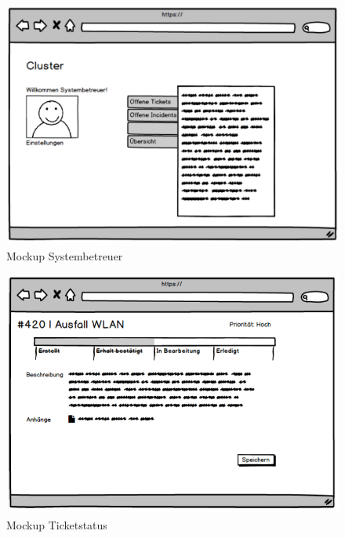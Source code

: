 \vspace{-.5cm}
\begin{figure}[h]
	\centering
	\includegraphics[scale=0.399]{figures/Wireframe_Systembetreuer.png}
	\caption{Mockup Systembetreuer}
	\label{Abb_Mockup_Systembetreuer}
\end{figure}



\vspace{.5cm}
\begin{figure}[h]
	\centering
	\includegraphics[scale=0.582]{figures/Wireframe_Ticket.png}
	\caption{Mockup Ticketstatus}
	\label{Abb_Mockup_Ticketstatus}
\end{figure}	

\newpage
